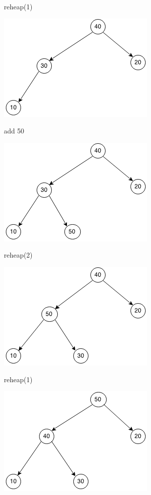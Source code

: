 \documentclass[10pt]{article}
\begin{document}
\begin{enumerate}
		\vspace{0.5cm}
		reheap(1)
		
		\vspace{0.5cm}
		\includegraphics[scale=0.5]{images/28_2_8.png}
		
		\vspace{0.5cm}
		add 50
		
		\vspace{0.5cm}
		\includegraphics[scale=0.5]{images/28_2_9.png}
		
		\vspace{0.5cm}
		reheap(2)
		
		\vspace{0.5cm}
		\includegraphics[scale=0.5]{images/28_2_10.png}
		
		\vspace{0.5cm}
		reheap(1)
		
		\vspace{0.5cm}
		\includegraphics[scale=0.5]{images/28_2_11.png}
		\vspace{0.5cm}
\end{enumerate}
\end{document}
